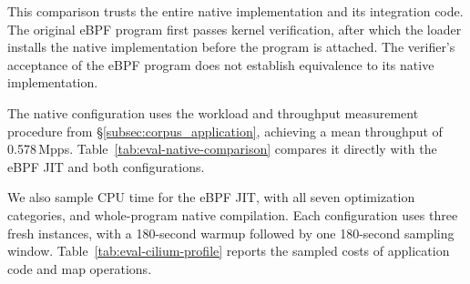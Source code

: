 This comparison trusts the entire native implementation and its integration code. The original eBPF program first passes kernel verification, after which the loader installs the native implementation before the program is attached. The verifier's acceptance of the eBPF program does not establish equivalence to its native implementation.

The native configuration uses the workload and throughput measurement procedure from \S\ref{subsec:corpus_application}, achieving a mean throughput of 0.578\,Mpps. Table~\ref{tab:eval-native-comparison} compares it directly with the eBPF JIT and both \tool configurations.

We also sample CPU time for the eBPF JIT, \tool with all seven optimization categories, and whole-program native compilation. Each configuration uses three fresh instances, with a 180-second warmup followed by one 180-second sampling window. Table~\ref{tab:eval-cilium-profile} reports the sampled costs of application code and map operations.